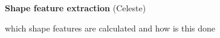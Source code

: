 \textbf{Shape feature extraction}  (Celeste)

which shape features are calculated and how is this done